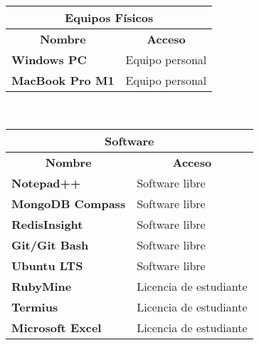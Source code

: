 \begin{center}
	\begin{tabular}{ | l | p{10cm} |}
		\hline
		\multicolumn{2}{|c|}{\textbf{Equipos Físicos}} \\
		\hline
		\multicolumn{1}{|c|}{\textbf{Nombre}} & \multicolumn{1}{|c|}{\textbf{Acceso}} \\
		\hline
		{\textbf{Windows PC}} & Equipo personal \\ \hline
		
		{\textbf{MacBook Pro M1}} & Equipo personal \\ \hline
	\end{tabular}
  \\
  \label{table:physical-equipment}
\end{center}

\begin{center}
	\begin{tabular}{ | l | p{10cm} |}
		\hline
		\multicolumn{2}{|c|}{\textbf{Software}} \\
		\hline
		\multicolumn{1}{|c|}{\textbf{Nombre}} & \multicolumn{1}{|c|}{\textbf{Acceso}} \\
		\hline
		
		{\textbf{Notepad++}} & Software libre \\ \hline
		
		{\textbf{MongoDB Compass}} & Software libre \\ \hline
		
		{\textbf{RedisInsight}} & Software libre \\ \hline
		
		{\textbf{Git/Git Bash}} & Software libre \\ \hline
		
		{\textbf{Ubuntu LTS}} & Software libre \\ \hline
		
		{\textbf{RubyMine}} & Licencia de estudiante \\ \hline
		
		{\textbf{Termius}} & Licencia de estudiante \\ \hline
		
		{\textbf{Microsoft Excel}} & Licencia de estudiante \\ \hline
	\end{tabular}
  \\
  \label{table:software}
\end{center}

